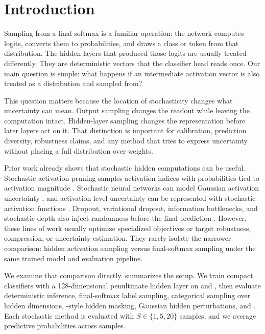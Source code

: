 \section{Introduction}
\label{sec:introduction}

Sampling from a final softmax is a familiar operation: the network computes logits, converts them to probabilities, and draws a class or token from that distribution. The hidden layers that produced those logits are usually treated differently. They are deterministic vectors that the classifier head reads once. Our main question is simple: what happens if an intermediate activation vector is also treated as a distribution and sampled from?

This question matters because the location of stochasticity changes what uncertainty can mean. Output sampling changes the readout while leaving the computation intact. Hidden-layer sampling changes the representation before later layers act on it. That distinction is important for calibration, prediction diversity, robustness claims, and any method that tries to express uncertainty without placing a full distribution over weights.

Prior work already shows that stochastic hidden computations can be useful. Stochastic activation pruning samples activation indices with probabilities tied to activation magnitude \cite{dhillon2018stochastic}. Stochastic neural networks can model Gaussian activation uncertainty \cite{yu2021simple}, and activation-level uncertainty can be represented with stochastic activation functions \cite{moralesalvarez2021activation}. Dropout, variational dropout, information bottlenecks, and stochastic depth also inject randomness before the final prediction \cite{gal2016dropout,kingma2015variational,achille2016information,alemi2017deep,huang2016deep}. However, these lines of work usually optimize specialized objectives or target robustness, compression, or uncertainty estimation. They rarely isolate the narrower comparison: hidden activation sampling versus final-softmax sampling under the same trained model and evaluation pipeline.

We examine that comparison directly.  summarizes the setup. We train compact \cnn classifiers with a 128-dimensional penultimate hidden layer on \mnist and \fashionmnist, then evaluate deterministic inference, final-softmax label sampling, categorical sampling over hidden dimensions, \sap-style hidden masking, Gaussian hidden perturbations, and \mcdropout. Each stochastic method is evaluated with $S \in \{1,5,20\}$ samples, and we average predictive probabilities across samples.

